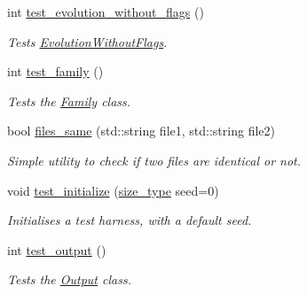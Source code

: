 \begin{DoxyCompactItemize}
\mbox{\label{namespaceretrocombinator_a3ad1d5cfdeffa706970f9176989460ca}} 
int \hyperlink{namespaceretrocombinator_a3ad1d5cfdeffa706970f9176989460ca}{test\+\_\+evolution\+\_\+without\+\_\+flags} ()
\begin{DoxyCompactList}\small\item\em Tests \hyperlink{classretrocombinator_1_1EvolutionWithoutFlags}{Evolution\+Without\+Flags}. \end{DoxyCompactList}\item 
\mbox{\label{namespaceretrocombinator_a08d7fbb4685cd952f8e4330b1370ba17}} 
int \hyperlink{namespaceretrocombinator_a08d7fbb4685cd952f8e4330b1370ba17}{test\+\_\+family} ()
\begin{DoxyCompactList}\small\item\em Tests the \hyperlink{classretrocombinator_1_1Family}{Family} class. \end{DoxyCompactList}\item 
bool \hyperlink{namespaceretrocombinator_aadb27262663ae58fda77172ae3d828dc}{files\+\_\+same} (std\+::string file1, std\+::string file2)
\begin{DoxyCompactList}\small\item\em Simple utility to check if two files are identical or not. \end{DoxyCompactList}\item 
\mbox{\label{namespaceretrocombinator_ae16ffd9c27be531d7abd3e582cfe1455}} 
void \hyperlink{namespaceretrocombinator_ae16ffd9c27be531d7abd3e582cfe1455}{test\+\_\+initialize} (\hyperlink{namespaceretrocombinator_a8e1541b50cee66a791df4c437ccbb385}{size\+\_\+type} seed=0)
\begin{DoxyCompactList}\small\item\em Initialises a test harness, with a default seed. \end{DoxyCompactList}\item 
\mbox{\label{namespaceretrocombinator_a48c6a2be6e6f3dbd9ae86114223983ac}} 
int \hyperlink{namespaceretrocombinator_a48c6a2be6e6f3dbd9ae86114223983ac}{test\+\_\+output} ()
\begin{DoxyCompactList}\small\item\em Tests the \hyperlink{classretrocombinator_1_1Output}{Output} class. \end{DoxyCompactList}\item 

\end{DoxyCompactItemize}
